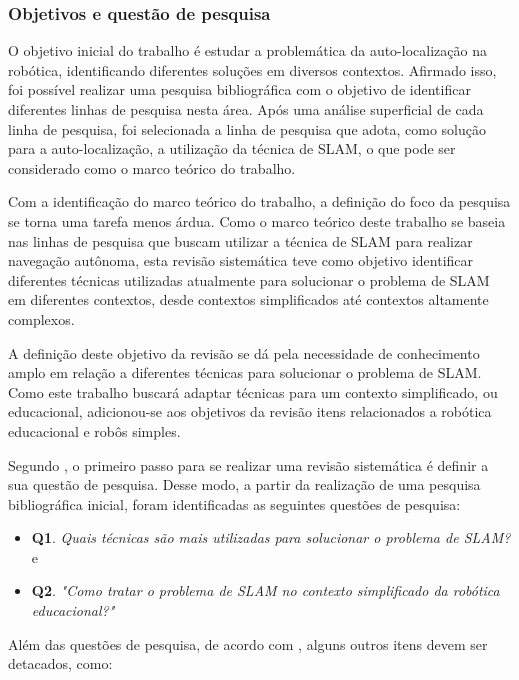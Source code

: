 		\subsubsection{Objetivos e questão de pesquisa}
		
		O objetivo inicial do trabalho é estudar a problemática da auto-localização na robótica, identificando diferentes soluções em diversos contextos. Afirmado isso, foi possível realizar uma pesquisa bibliográfica com o objetivo de identificar diferentes linhas de pesquisa nesta área. Após uma análise superficial de cada linha de pesquisa, foi selecionada a linha de pesquisa que adota, como solução para a auto-localização, a utilização da técnica de SLAM, o que pode ser considerado como o marco teórico do trabalho. 

		Com a identificação do marco teórico do trabalho, a definição do foco da pesquisa se torna uma tarefa menos árdua. Como o marco teórico deste trabalho se baseia nas linhas de pesquisa que buscam utilizar a técnica de SLAM para realizar navegação autônoma, esta revisão sistemática teve como objetivo identificar diferentes técnicas utilizadas atualmente para solucionar o problema de SLAM em diferentes contextos, desde contextos simplificados até contextos altamente complexos.

		A definição deste objetivo da revisão se dá pela necessidade de conhecimento amplo em relação a diferentes técnicas para solucionar o problema de SLAM. Como este trabalho buscará adaptar técnicas para um contexto simplificado, ou educacional, adicionou-se aos objetivos da revisão itens relacionados a robótica educacional e robôs simples.

		Segundo \cite{Kitchenham}, o primeiro passo para se realizar uma revisão sistemática é definir a sua questão de pesquisa. Desse modo, a partir da realização de uma pesquisa bibliográfica inicial, foram identificadas as seguintes questões de pesquisa: 

		\begin{itemize}
			\item \textbf{Q1}. \textit{Quais técnicas são mais utilizadas para solucionar o problema de SLAM?} e
			\item \textbf{Q2}. \textit{"Como tratar o problema de SLAM no contexto simplificado da robótica educacional?"}
		\end{itemize}

		Além das questões de pesquisa, de acordo com \cite{exemploRevisaoSistematica}, alguns outros itens devem ser detacados, como:

